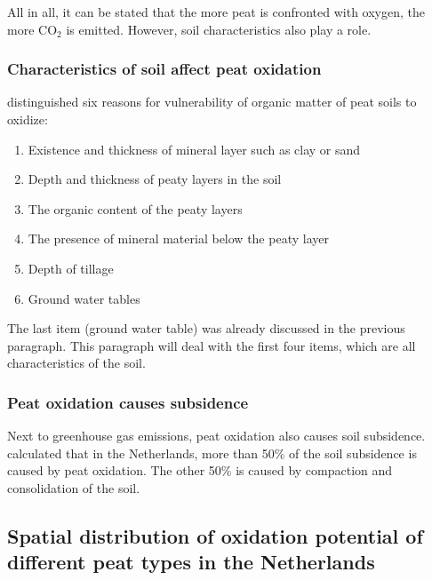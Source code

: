 \documentclass[12pt,a4paper,titlepage]{article}
\newcommand{\sous}[1]{\ensuremath{_{\textrm{#1}}}}
\begin{document}
All in all, it can be stated that the more peat is confronted with oxygen, the more CO\sous{2} is emitted. However, soil characteristics also play a role.


\subsubsection{Characteristics of soil affect peat oxidation}

\citet{stouthamer2008toelichting} distinguished six reasons for vulnerability of organic matter of peat soils to oxidize: 

\begin{enumerate}
\item{Existence and thickness of mineral layer such as clay or sand}
\item{Depth and thickness of peaty layers in the soil}
\item{The organic content of the peaty layers}
\item{The presence of mineral material below the peaty layer}
\item{Depth of tillage}
\item{Ground water tables}
\end{enumerate}

The last item (ground water table) was already discussed in the previous paragraph. This paragraph will deal with the first four items, which are all characteristics of the soil. 


\subsubsection{Peat oxidation causes subsidence}

Next to greenhouse gas emissions, peat oxidation also causes soil subsidence. \citet{SCHOTHORST1977265} calculated that in the Netherlands, more than 50\% of the soil subsidence is caused by peat oxidation. The other 50\% is caused by compaction and consolidation of the soil.

\subsection{Spatial distribution of oxidation potential of different peat types in the Netherlands}
\end{document}

